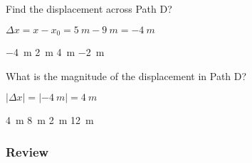 \documentclass[]{exam}
\newcounter{reviewcounter}
\begin{document}
\begin{questions}
\question
Find the displacement across Path D?

\ifprintanswers
{\color{red} 
$\Delta x = x - x_0 = \SI{5}{m} - \SI{9}{m} = \boxed{-\SI{4}{m}}$
}

\smallskip
\fi


\begin{randomizechoices}
    \correctchoice \SI{-4}{m}
    \choice \SI{2}{m}
    \choice \SI{4}{m}
    \choice \SI{-2}{m}
\end{randomizechoices}



\question \label{ghgjl}
What is the magnitude of the displacement in Path D?

\ifprintanswers
{\color{red} 
$ \left|\Delta x\right| = \left|-\SI{4}{m}\right| = \boxed{\SI{4}{m}}$
}

\smallskip
\fi

\begin{randomizechoices}
    \correctchoice \SI{4}{m}
    \choice \SI{8}{m}
    \choice \SI{2}{m}
    \choice \SI{12}{m}
\end{randomizechoices}

\end{questions}

\clearpage

\subsubsection*{Review \thereviewcounter}
\end{document}
